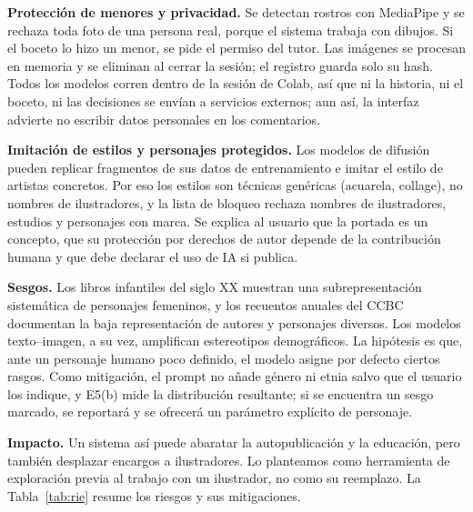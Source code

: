 \documentclass[10pt,a4paper,twocolumn]{article}
\begin{document}
\textbf{Protección de menores y privacidad.} Se detectan rostros con MediaPipe y se rechaza toda foto de una persona real, porque el sistema trabaja con dibujos. Si el boceto lo hizo un menor, se pide el permiso del tutor. Las imágenes se procesan en memoria y se eliminan al cerrar la sesión; el registro guarda solo su hash. Todos los modelos corren dentro de la sesión de Colab, así que ni la historia, ni el boceto, ni las decisiones se envían a servicios externos; aun así, la interfaz advierte no escribir datos personales en los comentarios.

\textbf{Imitación de estilos y personajes protegidos.} Los modelos de difusión pueden replicar fragmentos de sus datos de entrenamiento e imitar el estilo de artistas concretos. Por eso los estilos son técnicas genéricas (acuarela, collage), no nombres de ilustradores, y la lista de bloqueo rechaza nombres de ilustradores, estudios y personajes con marca. Se explica al usuario que la portada es un concepto, que su protección por derechos de autor depende de la contribución humana y que debe declarar el uso de IA si publica.

\textbf{Sesgos.} Los libros infantiles del siglo XX muestran una subrepresentación sistemática de personajes femeninos, y los recuentos anuales del CCBC documentan la baja representación de autores y personajes diversos. Los modelos texto--imagen, a su vez, amplifican estereotipos demográficos. La hipótesis es que, ante un personaje humano poco definido, el modelo asigne por defecto ciertos rasgos. Como mitigación, el prompt no añade género ni etnia salvo que el usuario los indique, y E5(b) mide la distribución resultante; si se encuentra un sesgo marcado, se reportará y se ofrecerá un parámetro explícito de personaje.

\textbf{Impacto.} Un sistema así puede abaratar la autopublicación y la educación, pero también desplazar encargos a ilustradores. Lo planteamos como herramienta de exploración previa al trabajo con un ilustrador, no como su reemplazo. La Tabla~\ref{tab:rie} resume los riesgos y sus mitigaciones.
\end{document}
